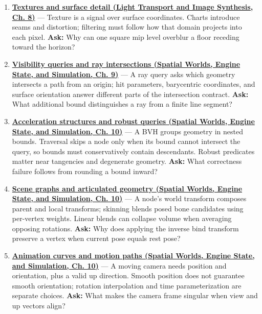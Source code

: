 \begin{enumerate}
\item
  \textbf{\href{../04-Light-Transport-and-Image-Synthesis/main.pdf\#nameddest=03-visual-computing-i-ch019-textures-and-surface-detail}{Textures and surface detail (Light Transport and Image Synthesis, Ch. 8)}} --- Texture is a signal over surface coordinates. Charts introduce seams and distortion; filtering must follow how that domain projects into each pixel. \textbf{Ask:} Why can one square mip level overblur a floor receding toward the horizon?
\item
  \textbf{\href{../05-Spatial-Worlds-Engine-State-and-Simulation/main.pdf\#nameddest=04-visual-computing-ii-ch028-visibility-queries-and-ray-intersections-1}{Visibility queries and ray intersections (Spatial Worlds, Engine State, and Simulation, Ch. 9)}} --- A ray query asks which geometry intersects a path from an origin; hit parameters, barycentric coordinates, and surface orientation answer different parts of the intersection contract. \textbf{Ask:} What additional bound distinguishes a ray from a finite line segment?
\item
  \textbf{\href{../05-Spatial-Worlds-Engine-State-and-Simulation/main.pdf\#nameddest=04-visual-computing-ii-ch029-acceleration-structures-and-robust-queries-1}{Acceleration structures and robust queries (Spatial Worlds, Engine State, and Simulation, Ch. 10)}} --- A BVH groups geometry in nested bounds. Traversal skips a node only when its bound cannot intersect the query, so bounds must conservatively contain descendants. Robust predicates matter near tangencies and degenerate geometry. \textbf{Ask:} What correctness failure follows from rounding a bound inward?
\item
  \textbf{\href{../05-Spatial-Worlds-Engine-State-and-Simulation/main.pdf\#nameddest=04-visual-computing-ii-ch029-scene-graphs-and-articulated-geometry}{Scene graphs and articulated geometry (Spatial Worlds, Engine State, and Simulation, Ch. 10)}} --- A node's world transform composes parent and local transforms; skinning blends posed bone candidates using per-vertex weights. Linear blends can collapse volume when averaging opposing rotations. \textbf{Ask:} Why does applying the inverse bind transform preserve a vertex when current pose equals rest pose?
\item
  \textbf{\href{../05-Spatial-Worlds-Engine-State-and-Simulation/main.pdf\#nameddest=04-visual-computing-ii-ch029-animation-curves-and-motion-paths}{Animation curves and motion paths (Spatial Worlds, Engine State, and Simulation, Ch. 10)}} --- A moving camera needs position and orientation, plus a valid up direction. Smooth position does not guarantee smooth orientation; rotation interpolation and time parameterization are separate choices. \textbf{Ask:} What makes the camera frame singular when view and up vectors align?

\end{enumerate}
